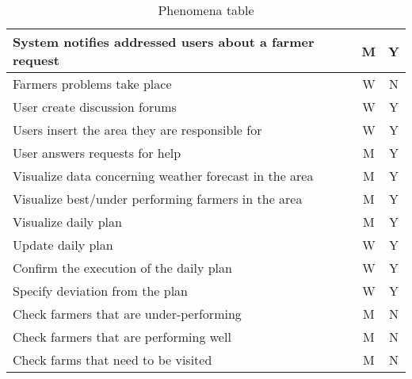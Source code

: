 \begin{table}[H]
\begin{tabular}{|l|c|c|}
        \hline
        System notifies addressed users about a farmer request          &   M   &   Y \\
        \hline
        Farmers problems take place                                     &   W   &   N \\
        \hline
        User create discussion forums                                   &   W   &   Y \\
        \hline
        Users insert the area they are responsible for                  &   W   &   Y \\
        \hline
        User answers requests for help                                  &   M   &   Y \\
        \hline
        Visualize data concerning weather forecast in the area          &   M   &   Y \\
        \hline
        Visualize best/under performing farmers in the area             &   M   &   Y \\
        \hline
        Visualize daily plan                                            &   M   &   Y \\
        \hline
        Update daily plan                                               &   W   &   Y \\
        \hline
        Confirm the execution of the daily plan                         &   W   &   Y \\
        \hline
        Specify deviation from the plan                                 &   W   &   Y \\
        \hline
        Check farmers that are under-performing                         &   M   &   N \\
        \hline
        Check farmers that are performing well                          &   M   &   N \\
        \hline
        Check farms that need to be visited                             &   M   &   N \\
        \hline
    \end{tabular}
    
    \caption{\label{tab:phenomena_table}Phenomena table}
    
\end{table}
\newpage
